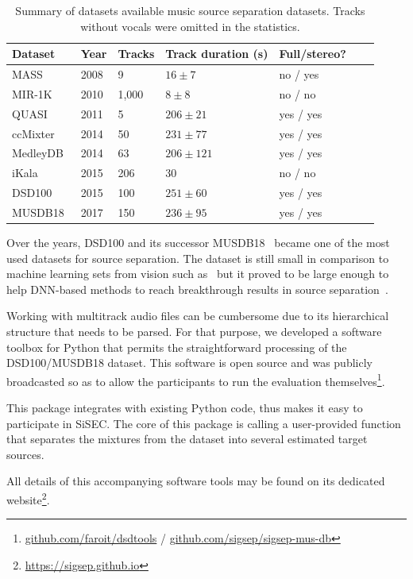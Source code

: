 \begin{table}[htbp]
	\centering
  \begin{tabular}{l l l l l l l}
    \toprule
    \textbf{Dataset} & \textbf{Year} & \textbf{Tracks} & \textbf{Track duration (s)} & \textbf{Full/stereo?}\\
    \midrule
    MASS~\cite{MTGMASSdb} & 2008 & 9 & $16 \pm 7$ & no / yes \\
    MIR-1K~\cite{hsu10} & 2010 & 1,000 & $8 \pm 8$ & no / no \\
    QUASI~\cite{liutkus11,vincent12} & 2011 & 5 & $206 \pm 21$ & yes / yes \\
    ccMixter~\cite{liutkus142} & 2014 & 50 & $231 \pm 77 $ & yes / yes \\
    MedleyDB~\cite{bittner14} & 2014 & 63 & $206 \pm 121$ & yes / yes \\
    iKala~\cite{chan15} & 2015 & 206 & 30 & no / no \\
    DSD100~\cite{liutkus17} & 2015 & 100 & $251 \pm 60$ & yes / yes \\
    MUSDB18~\cite{stoeter18sisec} & 2017 & 150 & $236 \pm 95$ & yes / yes \\
    \bottomrule
  \end{tabular}
  \caption{Summary of datasets available music source separation datasets. Tracks without vocals were omitted in the statistics.}
	\label{tab:datasets}
\end{table}

Over the years, DSD100 and its successor MUSDB18~\cite{oss_musdb} became one of the most used datasets for source separation.
The dataset is still small in comparison to machine learning sets from vision such as~\cite{imagenet09} but it proved to be large enough to help DNN-based methods to reach breakthrough results in source separation~\cite{stoeter18sisec}.
\par
Working with multitrack audio files can be cumbersome due to its hierarchical structure that needs to be parsed.
For that purpose, we developed a software toolbox for Python that permits the straightforward processing of the DSD100/MUSDB18 dataset. This software is open source and was publicly broadcasted so as to allow the participants to run the evaluation themselves\footnote{\url{github.com/faroit/dsdtools} / \url{github.com/sigsep/sigsep-mus-db}}.
\par
This package integrates with existing Python code, thus makes it easy to participate in \acs{SiSEC}. The core of this package is calling a user-provided function that separates the mixtures from the dataset into several estimated target sources.

All details of this accompanying software tools may be found on its dedicated website\footnote{\url{https://sigsep.github.io}}.